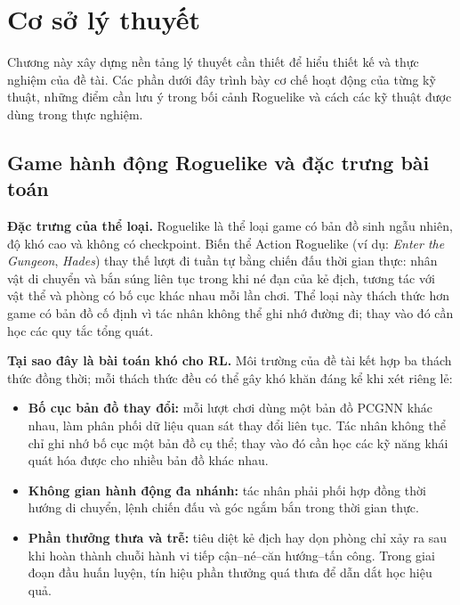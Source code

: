 \clearpage
{}

\setcounter{chapter}{0}
\chapter[{Cơ sở lý thuyết}]{Cơ sở lý thuyết}

Chương này xây dựng nền tảng lý thuyết cần thiết để hiểu thiết kế và thực nghiệm của đề tài. Các phần dưới đây trình bày cơ chế hoạt động của từng kỹ thuật, những điểm cần lưu ý trong bối cảnh Roguelike và cách các kỹ thuật được dùng trong thực nghiệm.

\section{Game hành động Roguelike và đặc trưng bài toán}

\textbf{Đặc trưng của thể loại.} Roguelike là thể loại game có bản đồ sinh ngẫu nhiên, độ khó cao và không có checkpoint. Biến thể Action Roguelike (ví dụ: \textit{Enter the Gungeon}, \textit{Hades}) thay thế lượt đi tuần tự bằng chiến đấu thời gian thực: nhân vật di chuyển và bắn súng liên tục trong khi né đạn của kẻ địch, tương tác với vật thể và phòng có bố cục khác nhau mỗi lần chơi. Thể loại này thách thức hơn game có bản đồ cố định vì tác nhân không thể ghi nhớ đường đi; thay vào đó cần học các quy tắc tổng quát.

\textbf{Tại sao đây là bài toán khó cho RL.} Môi trường của đề tài kết hợp ba thách thức đồng thời; mỗi thách thức đều có thể gây khó khăn đáng kể khi xét riêng lẻ:

\begin{itemize}
    \item \textbf{Bố cục bản đồ thay đổi:} mỗi lượt chơi dùng một bản đồ PCGNN khác nhau, làm phân phối dữ liệu quan sát thay đổi liên tục. Tác nhân không thể chỉ ghi nhớ bố cục một bản đồ cụ thể; thay vào đó cần học các kỹ năng khái quát hóa được cho nhiều bản đồ khác nhau.
    \item \textbf{Không gian hành động đa nhánh:} tác nhân phải phối hợp đồng thời hướng di chuyển, lệnh chiến đấu và góc ngắm bắn trong thời gian thực.
    \item \textbf{Phần thưởng thưa và trễ:} tiêu diệt kẻ địch hay dọn phòng chỉ xảy ra sau khi hoàn thành chuỗi hành vi tiếp cận--né--căn hướng--tấn công. Trong giai đoạn đầu huấn luyện, tín hiệu phần thưởng quá thưa để dẫn dắt học hiệu quả.
\end{itemize}

